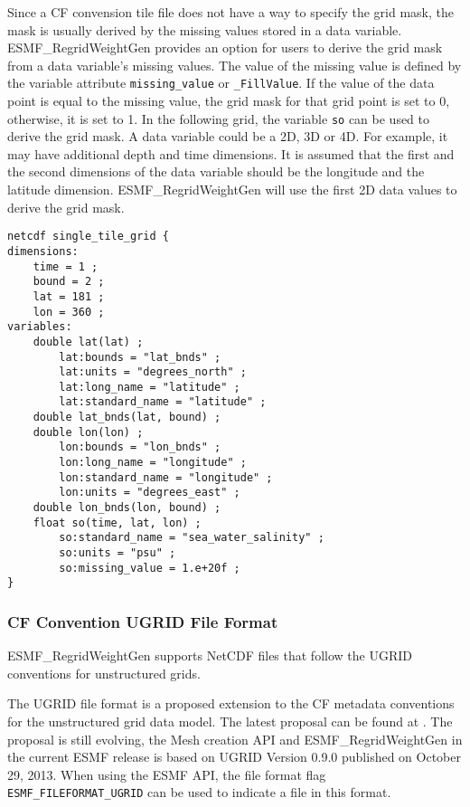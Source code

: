 Since a CF convension tile file does not have a way to specify the grid mask, the mask is usually derived by the missing values stored in a data variable.  ESMF\_RegridWeightGen provides an option for users to
derive the grid mask from a data variable's missing values.  The value of the missing value is defined by the
variable attribute {\tt missing\_value} or {\tt \_FillValue}.  If the value of the data point is equal to the
missing value, the grid mask for that grid point is set to 0, otherwise, it is set to 1.   In the following
grid, the variable {\tt so} can be used to derive the grid mask.  A data variable could be a 2D, 3D or 4D.
For example, it may have additional depth and time dimensions.
It is assumed that the first and the second dimensions of the data variable should be the longitude and the
latitude dimension.  ESMF\_RegridWeightGen will use the first 2D data values to derive the grid mask.

\begin{verbatim}
netcdf single_tile_grid {
dimensions:
	time = 1 ;
	bound = 2 ;
	lat = 181 ;
	lon = 360 ;
variables:
	double lat(lat) ;
		lat:bounds = "lat_bnds" ;
		lat:units = "degrees_north" ;
		lat:long_name = "latitude" ;
		lat:standard_name = "latitude" ;
	double lat_bnds(lat, bound) ;
	double lon(lon) ;
		lon:bounds = "lon_bnds" ;
		lon:long_name = "longitude" ;
		lon:standard_name = "longitude" ;
		lon:units = "degrees_east" ;
	double lon_bnds(lon, bound) ;
	float so(time, lat, lon) ;
		so:standard_name = "sea_water_salinity" ;
		so:units = "psu" ;
		so:missing_value = 1.e+20f ;
}
\end{verbatim}

\subsubsection{CF Convention UGRID File Format}\label{sec:fileformat:ugrid}

ESMF\_RegridWeightGen supports NetCDF files that follow the UGRID conventions for unstructured grids.

The UGRID file format is a proposed extension to the CF metadata conventions for the unstructured grid data model. The latest proposal can be found at .  The proposal is still evolving, the Mesh creation API and ESMF\_RegridWeightGen in the current ESMF release is based on UGRID Version 0.9.0 published on October 29, 2013. When using the ESMF API, the file format flag {\tt ESMF\_FILEFORMAT\_UGRID} can be used to indicate a file in this format.


